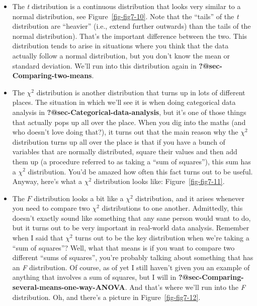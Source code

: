 \documentclass[
  a4paper,
]{book}
\providecommand{\tightlist}{%
  \setlength{\itemsep}{0pt}\setlength{\parskip}{0pt}}\usepackage{longtable,booktabs,array}
\begin{document}
\begin{itemize}
\tightlist
\item
  The \emph{t} distribution is a continuous distribution that looks very
  similar to a normal distribution, see Figure~\ref{fig-fig7-10}. Note
  that the ``tails'' of the \emph{t} distribution are ``heavier'' (i.e.,
  extend further outwards) than the tails of the normal distribution).
  That's the important difference between the two. This distribution
  tends to arise in situations where you think that the data actually
  follow a normal distribution, but you don't know the mean or standard
  deviation. We'll run into this distribution again in
  \textbf{?@sec-Comparing-two-means}.
\item
  The \(\chi^2\) distribution is another distribution that turns up in
  lots of different places. The situation in which we'll see it is when
  doing categorical data analysis in
  \textbf{?@sec-Categorical-data-analysis}, but it's one of those things
  that actually pops up all over the place. When you dig into the maths
  (and who doesn't love doing that?), it turns out that the main reason
  why the \(\chi^2\) distribution turns up all over the place is that if
  you have a bunch of variables that are normally distributed, square
  their values and then add them up (a procedure referred to as taking a
  ``sum of squares''), this sum has a \(\chi^2\) distribution. You'd be
  amazed how often this fact turns out to be useful. Anyway, here's what
  a \(\chi^2\) distribution looks like: Figure~\ref{fig-fig7-11}.
\item
  The \(F\) distribution looks a bit like a \(\chi^2\) distribution, and
  it arises whenever you need to compare two \(\chi^2\) distributions to
  one another. Admittedly, this doesn't exactly sound like something
  that any sane person would want to do, but it turns out to be very
  important in real-world data analysis. Remember when I said that
  \(\chi^2\) turns out to be the key distribution when we're taking a
  ``sum of squares''? Well, what that means is if you want to compare
  two different ``sums of squares'', you're probably talking about
  something that has an \emph{F} distribution. Of course, as of yet I
  still haven't given you an example of anything that involves a sum of
  squares, but I will in
  \textbf{?@sec-Comparing-several-means-one-way-ANOVA}. And that's where
  we'll run into the \emph{F} distribution. Oh, and there's a picture in
  Figure~\ref{fig-fig7-12}.
\end{itemize}
\end{document}

